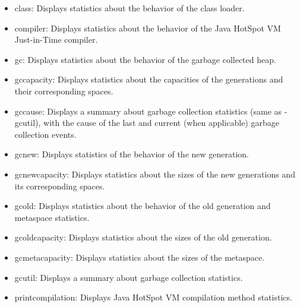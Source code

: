 \begin{itemize}

    \item class: Displays statistics about the behavior of the class loader.

    \item compiler: Displays statistics about the behavior of the Java HotSpot VM Just-in-Time compiler.

    \item gc: Displays statistics about the behavior of the garbage collected heap.

    \item gccapacity: Displays statistics about the capacities of the generations and their corresponding spaces.

    \item gccause: Displays a summary about garbage collection statistics (same as -gcutil), with the cause of the last and current (when applicable) garbage collection events.

    \item gcnew: Displays statistics of the behavior of the new generation.

    \item gcnewcapacity: Displays statistics about the sizes of the new generations and its corresponding spaces.

    \item gcold: Displays statistics about the behavior of the old generation and metaspace statistics.

    \item gcoldcapacity: Displays statistics about the sizes of the old generation.

    \item gcmetacapacity: Displays statistics about the sizes of the metaspace.

    \item gcutil: Displays a summary about garbage collection statistics.

    \item printcompilation: Displays Java HotSpot VM compilation method statistics.
    
\end{itemize}

